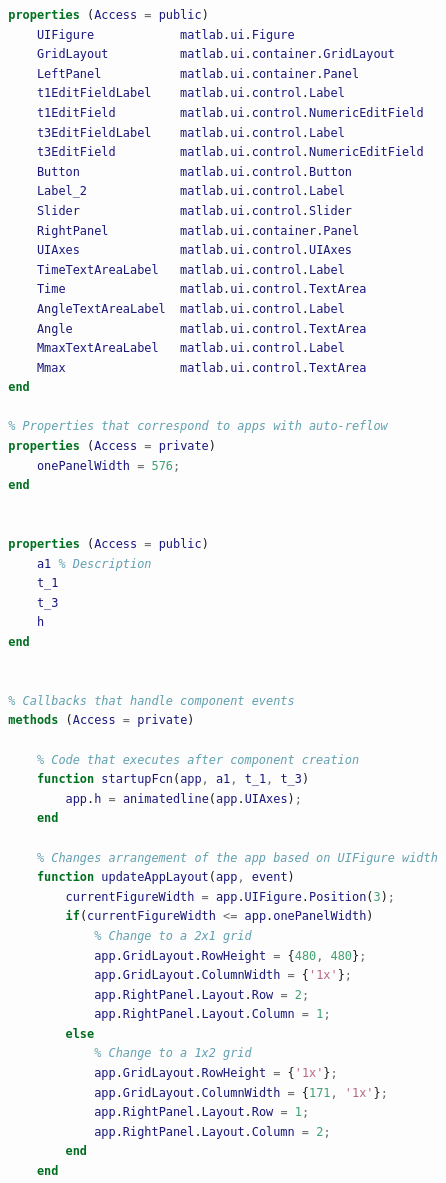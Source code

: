 \documentclass[withoutpreface,bwprint]{cumcmthesis} %
\begin{document}
\begin{appendices}
\begin{lstlisting}[language=matlab]
        % Properties that correspond to app components
        properties (Access = public)
            UIFigure            matlab.ui.Figure
            GridLayout          matlab.ui.container.GridLayout
            LeftPanel           matlab.ui.container.Panel
            t1EditFieldLabel    matlab.ui.control.Label
            t1EditField         matlab.ui.control.NumericEditField
            t3EditFieldLabel    matlab.ui.control.Label
            t3EditField         matlab.ui.control.NumericEditField
            Button              matlab.ui.control.Button
            Label_2             matlab.ui.control.Label
            Slider              matlab.ui.control.Slider
            RightPanel          matlab.ui.container.Panel
            UIAxes              matlab.ui.control.UIAxes
            TimeTextAreaLabel   matlab.ui.control.Label
            Time                matlab.ui.control.TextArea
            AngleTextAreaLabel  matlab.ui.control.Label
            Angle               matlab.ui.control.TextArea
            MmaxTextAreaLabel   matlab.ui.control.Label
            Mmax                matlab.ui.control.TextArea
        end
    
        % Properties that correspond to apps with auto-reflow
        properties (Access = private)
            onePanelWidth = 576;
        end
    
        
        properties (Access = public)
            a1 % Description
            t_1
            t_3
            h
        end
        
    
        % Callbacks that handle component events
        methods (Access = private)
    
            % Code that executes after component creation
            function startupFcn(app, a1, t_1, t_3)
                app.h = animatedline(app.UIAxes);
            end
    
            % Changes arrangement of the app based on UIFigure width
            function updateAppLayout(app, event)
                currentFigureWidth = app.UIFigure.Position(3);
                if(currentFigureWidth <= app.onePanelWidth)
                    % Change to a 2x1 grid
                    app.GridLayout.RowHeight = {480, 480};
                    app.GridLayout.ColumnWidth = {'1x'};
                    app.RightPanel.Layout.Row = 2;
                    app.RightPanel.Layout.Column = 1;
                else
                    % Change to a 1x2 grid
                    app.GridLayout.RowHeight = {'1x'};
                    app.GridLayout.ColumnWidth = {171, '1x'};
                    app.RightPanel.Layout.Row = 1;
                    app.RightPanel.Layout.Column = 2;
                end
            end
    

\end{lstlisting}
\end{appendices}
\end{document}
